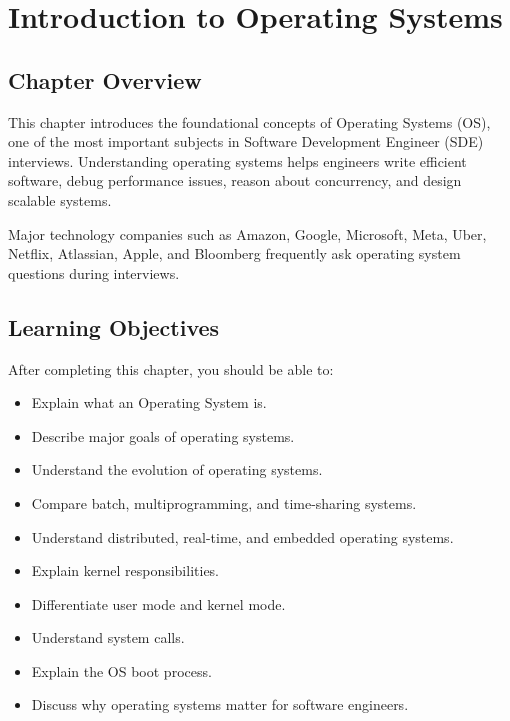\chapter{Introduction to Operating Systems}


\section{Chapter Overview}

This chapter introduces the foundational concepts of Operating Systems (OS), one of the most important subjects in Software Development Engineer (SDE) interviews. Understanding operating systems helps engineers write efficient software, debug performance issues, reason about concurrency, and design scalable systems.

Major technology companies such as Amazon, Google, Microsoft, Meta, Uber, Netflix, Atlassian, Apple, and Bloomberg frequently ask operating system questions during interviews.

\section{Learning Objectives}

After completing this chapter, you should be able to:

\begin{itemize}
\item Explain what an Operating System is.
\item Describe major goals of operating systems.
\item Understand the evolution of operating systems.
\item Compare batch, multiprogramming, and time-sharing systems.
\item Understand distributed, real-time, and embedded operating systems.
\item Explain kernel responsibilities.
\item Differentiate user mode and kernel mode.
\item Understand system calls.
\item Explain the OS boot process.
\item Discuss why operating systems matter for software engineers.
\end{itemize}

